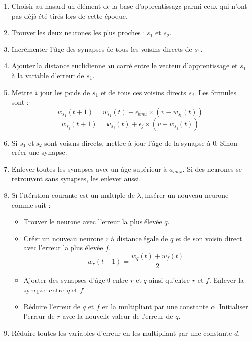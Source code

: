 	\begin{enumerate}
		\item Choisir au hasard un élément de la base d'apprentissage parmi ceux qui n'ont pas déjà été tirés lors de cette époque.
		\item Trouver les deux neurones les plus proches : $s_1$ et $s_2$.
		\item Incrémenter l'âge des synapses de tous les voisins directs de $s_1$.
		\item Ajouter la distance euclidienne au carré entre le vecteur d'apprentissage et $s_1$ à la variable d'erreur de $s_1$.
		\item Mettre à jour les poids de $s_1$ et de tous ces voisins directs $s_j$. Les formules sont :
		\begin{equation}
			w_{s_1}(t+1) = w_{s_1}(t) + \epsilon_{\textit{bmu}} \times (v - w_{s_1}(t))
		\end{equation}
		\begin{equation}
			w_{s_j}(t+1) = w_{s_j}(t) + \epsilon_{j} \times (v - w_{s_j}(t))
		\end{equation}
		\item Si $s_1$ et $s_2$ sont voisins directs, mettre à jour l'âge de la synapse à 0. Sinon créer une synapse.
		\item Enlever toutes les synapses avec un âge supérieur à $a_{\textit{max}}$. Si des neurones se retrouvent sans synapses, les enlever aussi.
		\item Si l'itération courante est un multiple de $\lambda$, insérer un nouveau neurone comme suit :
		\begin{itemize}
			\item Trouver le neurone avec l'erreur la plus élevée $q$.
			\item Créer un nouveau neurone $r$ à distance égale de $q$ et de son voisin direct avec l'erreur la plus élevée $f$.
			\begin{equation}
				w_r(t+1) = \frac{w_q(t) + w_f(t)}{2}  
			\end{equation}
			\item Ajouter des synapses d'âge 0 entre $r$ et $q$ ainsi qu'entre $r$ et $f$. Enlever la synapse entre $q$ et $f$.
			\item Réduire l'erreur de $q$ et $f$ en la multipliant par une constante $\alpha$. Initialiser l'erreur de $r$ avec la nouvelle valeur de l'erreur de $q$.
		\end{itemize}
		\item Réduire toutes les variables d'erreur en les multipliant par une constante $d$.
	\end{enumerate}

